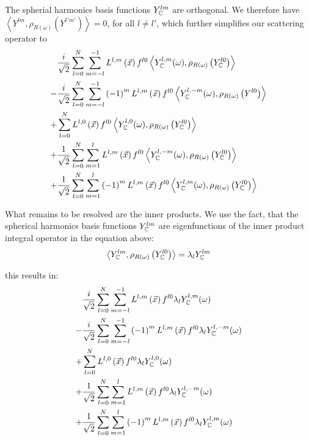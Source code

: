 \documentclass[10pt]{scrartcl}
\begin{document}
The spherial harmonics basis functions $Y_{\mathbb{C}}^{lm}$ are orthogonal. We therefore have $\left < Y^{lm}, \rho_{R(\omega)}\left(Y^{l'm'}\right) \right > = 0$, for all $l\ne l'$, which further simplifies our scattering operator to
\begin{align}
&
\frac{i}{\sqrt{2}}
\sum_{l=0}^{N}{
\sum_{m=-l}^{-1}{
L^{{l,m}}\left (\vec{x} \right )
f^{l0}
\left<
Y_{\mathbb{C}}^{l, m}(\omega )
, \rho_{R\left(\omega\right)}
\left(
Y_{\mathbb{C}}^{l0}
\right)
\right>
}
}
\\
-
&
\frac{i}{\sqrt{2}}
\sum_{l=0}^{N}{
\sum_{m=-l}^{-1}{
\left({-1}\right)^{m}
L^{{l,m}}\left (\vec{x} \right )
f^{l0}
\left<
Y_{\mathbb{C}}^{l, -m}(\omega )
, \rho_{R\left(\omega\right)}
\left(
Y^{l0}
\right)
\right>
}
}
\\
+
&
\sum_{l=0}^{N}{
L^{{l,0}}\left (\vec{x} \right )
f^{l0}
\left<
Y_{\mathbb{C}}^{l, 0}(\omega )
, \rho_{R\left(\omega\right)}
\left(
Y_{\mathbb{C}}^{l0}
\right)
\right>
}
\\
+
&
\frac{1}{\sqrt{2}}
\sum_{l=0}^{N}{
\sum_{m=1}^{l}{
L^{{l,m}}\left (\vec{x} \right )
f^{l0}
\left<
Y_{\mathbb{C}}^{l, -m}(\omega )
, \rho_{R\left(\omega\right)}
\left(
Y_{\mathbb{C}}^{l0}
\right)
\right>
}
}
\\
+
&
\frac{1}{\sqrt{2}}
\sum_{l=0}^{N}{
\sum_{m=1}^{l}{
\left({-1}\right)^{m}
L^{{l,m}}\left (\vec{x} \right )
f^{l0}
\left<
Y_{\mathbb{C}}^{l, m}(\omega )
, \rho_{R\left(\omega\right)}
\left(
Y_{\mathbb{C}}^{l0}
\right)
\right>
}
}
\end{align}

What remains to be resolved are the inner products. We use the fact, that the spherical harmonics basis functions $ Y_{\mathbb{C}}^{lm}$ are eigenfunctions of the inner product integral operator in the equation above:
\begin{align}
\left < Y_{\mathbb{C}}^{lm}, \rho_{R(\omega)}\left ( Y_{\mathbb{C}}^{l0} \right )\right > = \lambda_l Y_{\mathbb{C}}^{lm}
\end{align}

this results in:
\begin{align}
&
\frac{i}{\sqrt{2}}
\sum_{l=0}^{N}{
\sum_{m=-l}^{-1}{
L^{{l,m}}\left (\vec{x} \right )
f^{l0}
\lambda_l
Y_{\mathbb{C}}^{l, m}(\omega )
}
}
\\
-
&
\frac{i}{\sqrt{2}}
\sum_{l=0}^{N}{
\sum_{m=-l}^{-1}{
\left({-1}\right)^{m}
L^{{l,m}}\left (\vec{x} \right )
f^{l0}
\lambda_l
Y_{\mathbb{C}}^{l, -m}(\omega )
}
}
\\
+
&
\sum_{l=0}^{N}{
L^{{l,0}}\left (\vec{x} \right )
f^{l0}
\lambda_l
Y_{\mathbb{C}}^{l, 0}(\omega )
}
\\
+
&
\frac{1}{\sqrt{2}}
\sum_{l=0}^{N}{
\sum_{m=1}^{l}{
L^{{l,m}}\left (\vec{x} \right )
f^{l0}
\lambda_l
Y_{\mathbb{C}}^{l, -m}(\omega )
}
}
\\
+
&
\frac{1}{\sqrt{2}}
\sum_{l=0}^{N}{
\sum_{m=1}^{l}{
\left({-1}\right)^{m}
L^{{l,m}}\left (\vec{x} \right )
f^{l0}
\lambda_l
Y_{\mathbb{C}}^{l, m}(\omega )
}
}
\end{align}
\end{document}
